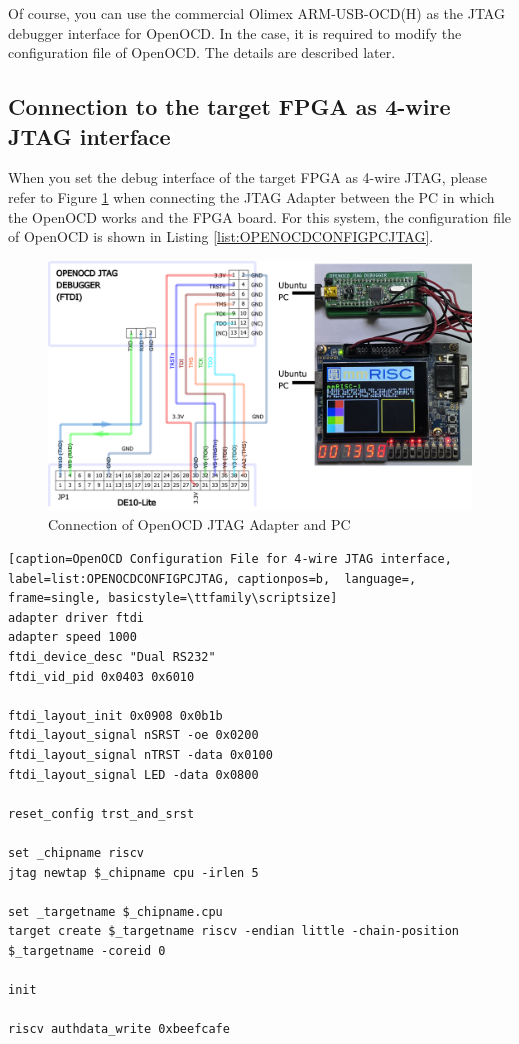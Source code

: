 Of course, you can use the commercial Olimex ARM-USB-OCD(H) as the JTAG debugger interface for OpenOCD. In the case, it is required to modify the configuration file of OpenOCD. The details are described later.

\subsection{Connection to the target FPGA as 4-wire JTAG interface}
\label{sec:CONNECTADAPTERJTAG}

When you set the debug interface of the target FPGA as 4-wire JTAG, please refer to Figure \ref{fig:USBJTAGCONNECTIONPC} when connecting the JTAG Adapter between the PC in which the OpenOCD works and the FPGA board. For this system, the configuration file of OpenOCD is shown in Listing \ref{list:OPENOCDCONFIGPCJTAG}.


\begin{figure}[H]
    \includegraphics[width=1.0\columnwidth]{./Figure/USB_JTAG_Connection_PC.png}
    \caption{Connection of OpenOCD JTAG Adapter and PC}
    \label{fig:USBJTAGCONNECTIONPC}
\end{figure}

\begin{lstlisting}[caption=OpenOCD Configuration File for 4-wire JTAG interface, label=list:OPENOCDCONFIGPCJTAG, captionpos=b,  language=, frame=single, basicstyle=\ttfamily\scriptsize]
adapter driver ftdi
adapter speed 1000
ftdi_device_desc "Dual RS232"
ftdi_vid_pid 0x0403 0x6010

ftdi_layout_init 0x0908 0x0b1b
ftdi_layout_signal nSRST -oe 0x0200
ftdi_layout_signal nTRST -data 0x0100
ftdi_layout_signal LED -data 0x0800

reset_config trst_and_srst

set _chipname riscv
jtag newtap $_chipname cpu -irlen 5

set _targetname $_chipname.cpu
target create $_targetname riscv -endian little -chain-position $_targetname -coreid 0

init

riscv authdata_write 0xbeefcafe
\end{lstlisting}


